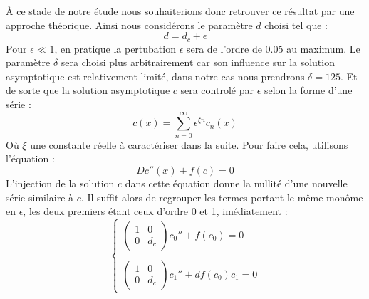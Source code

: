 \documentclass[12pt,a4paper]{article}
\begin{document}
À ce stade de notre étude nous souhaiterions donc retrouver ce résultat par une approche théorique. Ainsi nous considérons le paramètre $d$ choisi tel que :
\begin{equation}
d = d_c + \epsilon
\end{equation}
Pour $\epsilon \ll 1$, en pratique la pertubation $\epsilon$ sera de l'ordre de 0.05 au maximum. Le paramètre $\delta$ sera choisi plus arbitrairement car son influence sur la solution asymptotique est relativement limité, dans notre cas nous prendrons $\delta = 125$. Et de sorte que la solution asymptotique $c$ sera controlé par $\epsilon$ selon la forme d'une série : 
\begin{equation}
c(x) = \sum_{n=0}^{\infty} \epsilon^{\xi n} c_n (x)
\end{equation}
Où $\xi$ une constante réelle à caractériser dans la suite. Pour faire cela, utilisons l'équation : 
\begin{equation}
Dc''(x) + f(c)=0
\end{equation}
L'injection de la solution $c$ dans cette équation donne la nullité d'une nouvelle série similaire à $c$. Il suffit alors de regrouper les termes portant le même monôme en $\epsilon$, les deux premiers étant ceux d'ordre 0 et 1, imédiatement : \\

\begin{equation}
\left\{
    \begin{array}{ll}
        \begin{pmatrix}
        1 & 0\\
        0 & d_c
        \end{pmatrix} c_0'' + f(c_0) = 0
        \\
        \\
        \begin{pmatrix}
        1 & 0\\
        0 & d_c
        \end{pmatrix} c_1'' + df(c_0)c_1 = 0
    \end{array}
\right.
\end{equation}
\\
\end{document}
